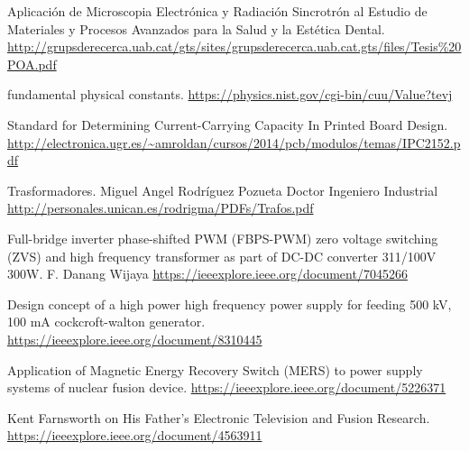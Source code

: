 \documentclass[twoside,22pt]{Latex/Classes/thesisUMSNH}
\begin{document}


\begin{thebibliography}{2}
   Aplicación de Microscopia Electrónica y Radiación
Sincrotrón al Estudio de Materiales y Procesos
Avanzados para la Salud y la Estética Dental. \url{http://grupsderecerca.uab.cat/gts/sites/grupsderecerca.uab.cat.gts/files/Tesis\%20POA.pdf}

fundamental physical constants. \url{https://physics.nist.gov/cgi-bin/cuu/Value?tevj}

Standard for Determining Current-Carrying Capacity In Printed Board Design. \url{http://electronica.ugr.es/~amroldan/cursos/2014/pcb/modulos/temas/IPC2152.pdf}

Trasformadores. Miguel Angel Rodríguez Pozueta
Doctor Ingeniero Industrial \url{http://personales.unican.es/rodrigma/PDFs/Trafos.pdf}

Full-bridge inverter phase-shifted PWM (FBPS-PWM) zero voltage switching (ZVS) and high frequency transformer as part of DC-DC converter 311/100V 300W. F. Danang Wijaya \url{https://ieeexplore.ieee.org/document/7045266}


Design concept of a high power high frequency power supply for feeding 500 kV, 100 mA cockcroft-walton generator. \url{https://ieeexplore.ieee.org/document/8310445}

Application of Magnetic Energy Recovery Switch (MERS) to power supply systems of nuclear fusion device. \url{https://ieeexplore.ieee.org/document/5226371}

Kent Farnsworth on His Father's Electronic Television and Fusion Research. \url{https://ieeexplore.ieee.org/document/4563911}


\end{thebibliography}
\end{document}
